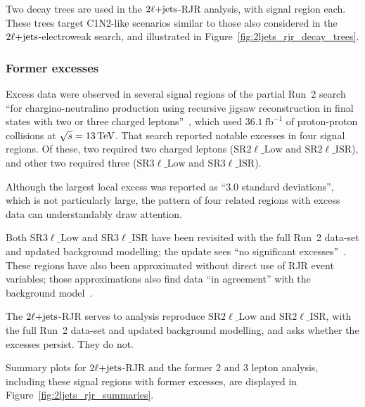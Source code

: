 Two decay trees are used in the $\twoljets$-RJR analysis, with signal region
each.
These trees target C1N2-like scenarios similar to those also considered in the
$\twoljets$-electroweak search,
and illustrated in Figure~\ref{fig:2ljets_rjr_decay_trees}.

\subsubsection{Former excesses}
Excess data were observed in several signal regions of the partial Run~2
search ``for chargino-neutralino production using recursive
jigsaw reconstruction in final states with two or three charged
leptons''~\cite{atlas_rjr_23l_SUSY_2017_03},
which used $36.1~\mathrm{fb}^{-1}$ of proton-proton collisions at
$\sqrt{s} = 13\,\eV[T]$.
That search reported notable excesses in four signal regions.
Of these, two required two charged leptons
($\mathrm{SR}2\ell\_\mathrm{Low}$ and $\mathrm{SR}2\ell\_\mathrm{ISR}$),
and other two required three
($\mathrm{SR}3\ell\_\mathrm{Low}$ and $\mathrm{SR}3\ell\_\mathrm{ISR}$).

Although the largest local excess was reported as ``$3.0$ standard deviations'',
which is not particularly large, the pattern of four related regions with
excess data can understandably draw attention.

Both $\mathrm{SR}3\ell\_\mathrm{Low}$ and $\mathrm{SR}3\ell\_\mathrm{ISR}$
have been revisited with the full Run~2 data-set and updated background
modelling;
the update sees ``no significant excesses''~\cite{atlas_rjr_3l_SUSY_2019_09}.
These regions have also been approximated without direct use of RJR event
variables;
those approximations also find data ``in agreement'' with the background
model~\cite{atlas_rjr_mimic_SUSY_2018_06}.

The $\twoljets$-RJR serves to analysis reproduce
$\mathrm{SR}2\ell\_\mathrm{Low}$ and $\mathrm{SR}2\ell\_\mathrm{ISR}$,
with the full Run~2 data-set and updated background modelling,
and asks whether the excesses persist.
They do not.

Summary plots for $\twoljets$-RJR and the former 2 and 3 lepton analysis,
including these signal regions with former excesses,
are displayed in Figure~\ref{fig:2ljets_rjr_summaries}.

